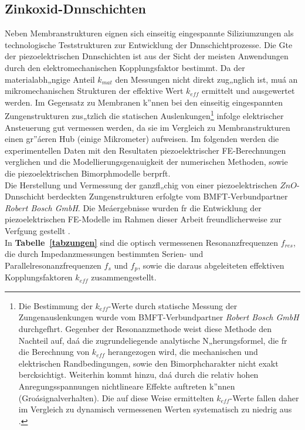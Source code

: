 \subsection{Zinkoxid-Dnnschichten}
\label{zno}

Neben Membranstrukturen eignen sich einseitig eingespannte Siliziumzungen
als technologische Teststrukturen zur Entwicklung der
Dnnschichtprozesse. Die Gte der piezoelektrischen
Dnnschichten ist aus der Sicht der meisten Anwendungen durch den
elektromechanischen Kopplungsfaktor bestimmt. Da der materialabh„ngige
Anteil $k_{mat}$ den Messungen nicht direkt zug„nglich ist, muá an
mikromechanischen Strukturen der effektive Wert $k_{eff}$ ermittelt
und ausgewertet werden. Im Gegensatz zu Membranen k”nnen bei den einseitig
eingespannten Zungenstrukturen zus„tzlich die statischen
%
Auslenkungen\footnote{Die Bestimmung der $k_{eff}$-Werte durch statische
Messung der Zungenauslenkungen wurde vom BMFT-Verbundpartner
{\sl Robert Bosch GmbH} durchgefhrt. Gegenber der Resonanzmethode weist
diese Methode den Nachteil auf, daá die zugrundeliegende analytische
N„herungsformel, die fr die Berechnung von $k_{eff}$ herangezogen
wird, die mechanischen und elektrischen Randbedingungen, sowie den
Bimorphcharakter nicht exakt bercksichtigt. Weiterhin kommt hinzu, daá
durch die relativ hohen Anregungsspannungen %
nichtlineare Effekte auftreten k”nnen (Groásignalverhalten). Die auf diese
Weise ermittelten $k_{eff}$-Werte fallen daher im Vergleich zu dynamisch
vermessenen Werten systematisch zu niedrig aus \cite{ABV93}.}
%
infolge elektrischer Ansteuerung gut vermessen werden, da sie im Vergleich
zu Membranstrukturen einen gr”áeren Hub (einige Mikrometer) aufweisen.
Im folgenden werden die
experimentellen Daten mit den Resultaten piezoelektrischer FE-Berechnungen
verglichen und die Modellierungsgenauigkeit der numerischen Methoden, sowie
die piezoelektrischen Bimorphmodelle berprft.\\
%
Die Herstellung und Vermessung der
ganzfl„chig von einer piezoelektrischen $ZnO$-Dnnschicht berdeckten
Zungenstrukturen erfolgte vom BMFT-Verbundpartner {\sl Robert Bosch GmbH}.
Die Meáergebnisse wurden fr die Entwicklung der piezoelektrischen
FE-Modelle im Rahmen dieser Arbeit freundlicherweise zur Verfgung gestellt
\cite{Flik}.\\
%
In {\bf Tabelle~\ref{tabzungen}} sind die optisch vermessenen
Resonanzfrequenzen $f_{res}$, die durch Impedanzmessungen bestimmten
Serien- und Parallelresonanzfrequenzen $f_{s}$ und $f_{p}$, sowie die
daraus abgeleiteten effektiven Kopplungsfaktoren $k_{eff}$ zusammengestellt.
